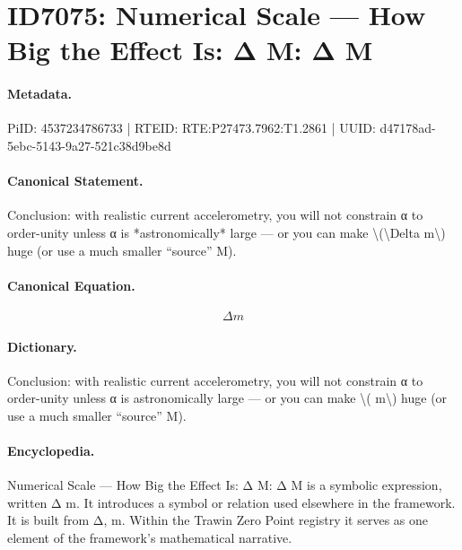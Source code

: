 \section*{ID7075: Numerical Scale — How Big the Effect Is: Δ M: Δ M}
\paragraph{Metadata.}
PiID: 4537234786733 | RTEID: RTE:P27473.7962:T1.2861 | UUID: d47178ad-5ebc-5143-9a27-521c38d9be8d

\paragraph{Canonical Statement.}
Conclusion: with realistic current accelerometry, you will not constrain α to order-unity unless α is *astronomically* large — or you can make \textbackslash{}(\textbackslash{}Delta m\textbackslash{}) huge (or use a much smaller “source” M).

\paragraph{Canonical Equation.}
\[
\Delta m
\]

\paragraph{Dictionary.}
Conclusion: with realistic current accelerometry, you will not constrain α to order-unity unless α is astronomically large — or you can make \textbackslash{}( m\textbackslash{}) huge (or use a much smaller “source” M).

\paragraph{Encyclopedia.}
Numerical Scale — How Big the Effect Is: Δ M: Δ M is a symbolic expression, written Δ m. It introduces a symbol or relation used elsewhere in the framework. It is built from Δ, m. Within the Trawin Zero Point registry it serves as one element of the framework's mathematical narrative.
